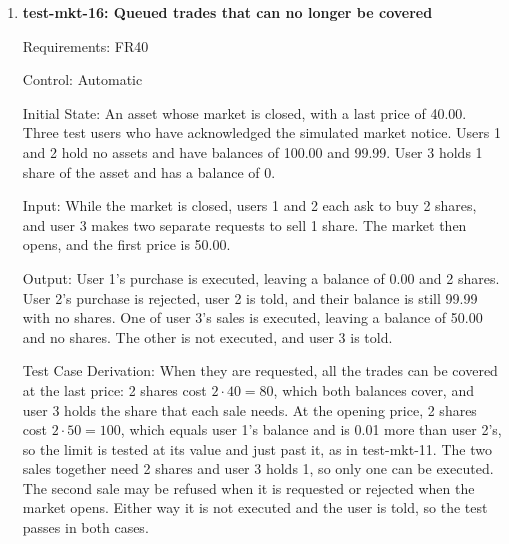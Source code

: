 \documentclass[12pt, titlepage]{article}
\begin{document}
\begin{enumerate}
Output: The response gives the trade the status queued, with a notice that it
will run at the opening price. After the market opens, the trade is executed
at 42.00, leaving a balance of 958 and 1 share.

Test Case Derivation: FR40 queues a trade requested while the market is closed
and executes it at the first price obtained after the market opens. The last
price before the open, the first price after it, and a later price are all
different, giving balances of 960, 958, and 957, so the balance shows which
price was used. The later price arrives before the balance is read, which
catches a backend that runs queued trades at whatever price is current when
it reaches them, not at the first price after the open. The price from the
previous close is older than \texttt{QUOTE\_STALENESS\_LIMIT}, so the test
also checks that FR39 does not refuse the trade while the market is closed.

How test will be performed: A pytest test sends the purchase while the market
is closed, checks the response, opens the market, sends the two prices, and
reads the balance, holdings, and trade through the API. A Jest test renders
the app's response to the queued trade and checks that it shows the trade as
queued with the notice.

\item{\textbf{test-mkt-16: Queued trades that can no longer be covered}\\}

Requirements: FR40

Control: Automatic

Initial State: An asset whose market is closed, with a last price of 40.00.
Three test users who have acknowledged the simulated market notice. Users 1
and 2 hold no assets and have balances of 100.00 and 99.99. User 3 holds 1
share of the asset and has a balance of 0.

Input: While the market is closed, users 1 and 2 each ask to buy 2 shares,
and user 3 makes two separate requests to sell 1 share. The market then opens,
and the first price is 50.00.

Output: User 1's purchase is executed, leaving a balance of 0.00 and 2 shares.
User 2's purchase is rejected, user 2 is told, and their balance is still
99.99 with no shares. One of user 3's sales is executed, leaving a balance of
50.00 and no shares. The other is not executed, and user 3 is told.

Test Case Derivation: When they are requested, all the trades can be covered
at the last price: 2 shares cost $2 \cdot 40 = 80$, which both balances cover,
and user 3 holds the share that each sale needs. At the opening price, 2
shares cost $2 \cdot 50 = 100$, which equals user 1's balance and is 0.01 more
than user 2's, so the limit is tested at its value and just past it, as in
test-mkt-11. The two sales together need 2 shares and user 3 holds 1, so only
one can be executed. The second sale may be refused when it is requested or
rejected when the market opens. Either way it is not executed and the user is
told, so the test passes in both cases.


\end{enumerate}
\end{document}
